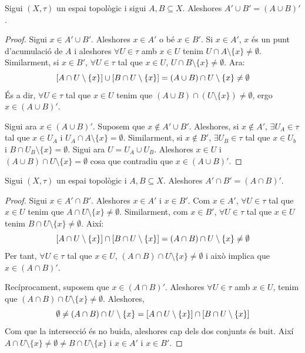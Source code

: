 \documentclass[../main.tex]{subfiles}
\begin{document}
\begin{prop}
\label{prop:propietat2acumulacio} Sigui $(X,\tau)$ un espai topològic i sigui $A,B\subseteq X$. Aleshores $A'\cup B'= (A\cup B)'$.
\end{prop}
\begin{proof}
Sigui $x\in A'\cup B'$. Aleshores $x\in A'$ o bé $x\in B'$. Si $x\in A'$, $x$ és un punt d'acumulació de $A$ i aleshores $\forall U\in\tau$ amb $x\in U$ tenim $U\cap A\setminus\{x\}\not=\emptyset$. Similarment, si $x\in B'$, $\forall U\in\tau$ tal que $x\in U$, $U\cap B\setminus\{x\}\not=\emptyset$. Ara:
\begin{equation}
    \notag
    [A\cap U\setminus\{x\}]\cup[B\cap U\setminus\{x\}] = (A\cup B)\cap U\setminus\{x\}\not=\emptyset
\end{equation}
És a dir, $\forall U\in\tau$ tal que $x\in U$ tenim que $(A\cup B)\cap (U\setminus\{x\})\not=\emptyset$, ergo $x\in (A\cup B)'$.

Sigui ara $x\in (A\cup B)'$. Suposem que $x\not\in A'\cup B'$. Aleshores, si $x\not\in A'$, $\exists U_A\in\tau$ tal que $x\in U_A$ i $U_A\cap A\setminus\{x\} = \emptyset$. Similarment, si $x\not\in B'$, $\exists U_B\in\tau$ tal que $x\in U_b$ i $B\cap U_B\setminus\{x\}=\emptyset$. Sigui ara $U = U_A\cup U_B$. Aleshores $x\in U$ i $(A\cup B)\cap U\setminus\{x\}=\emptyset$ cosa que contradiu que $x\in (A\cup B)'$.
\end{proof}

\begin{prop}
\label{prop:propietat3acumulació} Sigui $(X,\tau)$ un espai topològic i $A,B\subseteq X$. Aleshores $A'\cap B'=(A\cap B)'$.
\end{prop}
\begin{proof}
Sigui $x\in A'\cap B'$. Aleshores $x\in A'$ i $x\in B'$. Com $x\in A'$, $\forall U\in\tau$ tal que $x\in U$ tenim que $A\cap U\setminus\{x\}\not=\emptyset$. Similarment, com $x\in B'$, $\forall U\in\tau$ tal que $x\in U$ tenim $B\cap U\setminus\{x\}\not=\emptyset$. Així:
\begin{equation}
    \notag
    [A\cap U\setminus\{x\}]\cap[B\cap U\setminus\{x\}] = (A\cap B)\cap U\setminus\{x\} \not= \emptyset
\end{equation}
Per tant, $\forall U\in\tau$ tal que $x\in U$, $(A\cap B)\cap U\setminus\{x\}\not=\emptyset$ i això implica que $x\in (A\cap B)'$.

Recíprocament, suposem que $x\in (A\cap B)'$. Aleshores $\forall U\in\tau$ amb $x\in U$, tenim que $(A\cap B)\cap U\setminus\{x\}\not=\emptyset$. Aleshores, 
\begin{equation}
    \notag
    \emptyset\not= (A\cap B)\cap U\setminus\{x\} = [A\cap U\setminus\{x\}]\cap[B\cap U\setminus\{x\}]
\end{equation}
Com que la intersecció és no buida, aleshores cap dels dos conjunts és buit. Així $A\cap U\setminus\{x\}\not=\emptyset\not= B\cap U\setminus\{x\}$ i $x\in A'$ i $x\in B'$.
\end{proof}
\end{document}
